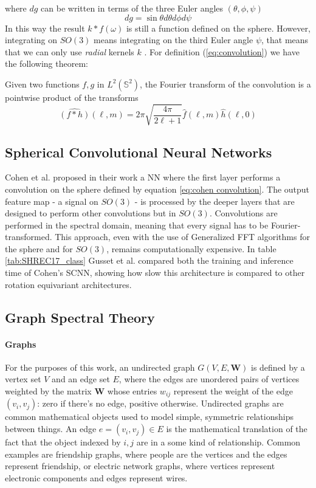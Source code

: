 where $dg$ can be written in terms of the three Euler angles $(\theta, \phi, \psi)$ 
$$dg=\sin\theta d\theta d\phi d\psi$$
In this way the result $k * f(\omega)$ is still a function defined on the sphere. However, integrating on $SO(3)$ means integrating on the third Euler angle $\psi$, that means that we can only use \textit{radial} kernels $k$ .
For definition (\ref{eq:convolution}) we have the following theorem:
\vspace{0.5cm}
\begin{theorem}
	Given two functions $f, g$ in $L^2(\mathbb S^2)$, the Fourier transform of the convolution is a pointwise product of the transforms
$$
\hat{(f * h)}(\ell, m)=2 \pi \sqrt{\frac{4 \pi}{2 \ell+1}} \hat{f}(\ell, m) \hat{h}(\ell, 0)
$$
\end{theorem}
\vspace{0.5cm}

\subsection{Spherical Convolutional Neural Networks}
Cohen et al. \cite{SCNN} proposed in their work a NN where the first layer performs a convolution on the sphere defined by equation \ref{eq:cohen convolution}. The output feature map - a signal on $SO(3)$ - is processed by the deeper layers that are designed to perform other convolutions but in $SO(3)$. Convolutions are performed in the spectral domain, meaning that every signal has to be Fourier-transformed. This approach, even with the use of Generalized FFT algorithms for the sphere and for $SO(3)$, remains computationally expensive. In table \ref{tab:SHREC17_class} Gusset et al. \cite{Gusset} compared both the training and inference time of Cohen's SCNN, showing how slow this architecture is compared to other rotation equivariant architectures.
\subsection{Graph Spectral Theory} \label{sec:Chapter1: Spectral Graph Theory}
\paragraph{Graphs}
For the purposes of this work, an undirected graph $G(V, E, \mathbf W)$ is defined by a vertex set $V$ and an edge set $E$, where the edges are unordered pairs of vertices weighted by the matrix $\mathbf W$ whose entries $w_{ij}$ represent the weight of the edge $(v_i, v_j)$: zero if there's no edge, positive otherwise. Undirected graphs are common mathematical objects used to model simple, symmetric relationships between things. An edge $e = (v_i, v_j) \in E$ is the mathematical translation of the fact that the object indexed by $i, j$ are in a some kind of relationship. Common examples are friendship graphs, where people are the vertices and the edges represent friendship, or electric network graphs, where vertices represent electronic components and edges represent wires.
